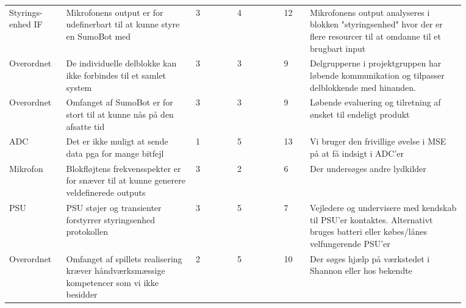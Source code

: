 \begin{landscape}
\begin{table}[]
\begin{tabular}{
p{0.1\linewidth} %
p{0.25\linewidth} %
p{0.08\linewidth} %
p{0.09\linewidth} %
p{0.05\linewidth} %
p{0.3\linewidth} %
}
Styrings-enhed IF & Mikrofonens output er for   udefinerbart til at kunne styre en SumoBot med                                                                   & 3           & 4           & 12     & Mikrofonens output analyseres i   blokken "styringsenhed" hvor der er flere resourcer til at omdanne   til et brugbart input                                                 \\\cmidrule(lr){1-6}
Overordnet       & De individuelle delblokke kan   ikke forbindes til et samlet system                                                                          & 3           & 3           & 9      & Delgrupperne i projektgruppen   har løbende kommunikation og tilpasser delblokkende med hinanden.                                                                            \\\cmidrule(lr){1-6}
Overordnet       & Omfanget af SumoBot er for stort   til at kunne nås på den afsatte tid                                                                       & 3           & 3           & 9      & Løbende evaluering og tilretning   af ønsket til endeligt produkt                                                                                                            \\\cmidrule(lr){1-6}
ADC              & Det er ikke muligt at sende data   pga for mange bitfejl                                                                                     & 1           & 5           & 13     & Vi bruger den frivillige øvelse   i MSE på at få indsigt i ADC'er                                                                                                            \\\cmidrule(lr){1-6}
Mikrofon         & Blokfløjtens frekvensspekter er   for snæver til at kunne generere veldefinerede outputs                                                     & 3           & 2           & 6      & Der undersøges andre lydkilder                                                                                                                                               \\\cmidrule(lr){1-6}
PSU              & PSU støjer og transienter   forstyrrer styringsenhed protokollen                                                                             & 3           & 5           & 7      & Vejledere og undervisere med   kendskab til PSU'er kontaktes. Alternativt bruges batteri eller købes/lånes   velfungerende PSU'er                                            \\\cmidrule(lr){1-6}
Overordnet       & Omfanget af spillets realisering   kræver håndværksmæssige kompetencer som vi ikke besidder                                                  & 2           & 5           & 10     & Der søges hjælp på værkstedet i   Shannon eller hos bekendte                                                                                                                 \\\cmidrule(lr){1-6}

\end{tabular}
\end{table}
\end{landscape}
